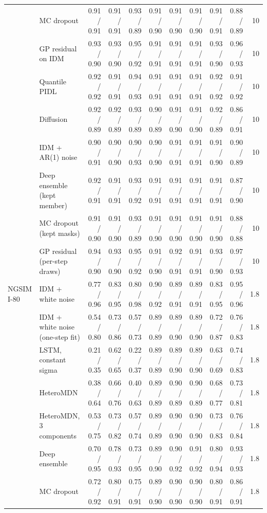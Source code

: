 \begin{longtable}{llrrrrrrrrr}
 & MC dropout & 0.91 / 0.91 & 0.91 / 0.91 & 0.93 / 0.89 & 0.91 / 0.90 & 0.91 / 0.90 & 0.91 / 0.90 & 0.91 / 0.91 & 0.88 / 0.89 & 10 \\
 & GP residual on IDM & 0.93 / 0.90 & 0.93 / 0.90 & 0.95 / 0.92 & 0.91 / 0.91 & 0.91 / 0.91 & 0.91 / 0.91 & 0.93 / 0.90 & 0.96 / 0.93 & 10 \\
 & Quantile PIDL & 0.92 / 0.92 & 0.91 / 0.91 & 0.94 / 0.93 & 0.91 / 0.91 & 0.91 / 0.91 & 0.91 / 0.91 & 0.92 / 0.92 & 0.91 / 0.92 & 10 \\
 & Diffusion & 0.92 / 0.89 & 0.92 / 0.89 & 0.93 / 0.89 & 0.90 / 0.89 & 0.91 / 0.90 & 0.91 / 0.90 & 0.92 / 0.89 & 0.86 / 0.91 & 10 \\
 & IDM + AR(1) noise & 0.90 / 0.91 & 0.90 / 0.90 & 0.90 / 0.93 & 0.90 / 0.90 & 0.91 / 0.91 & 0.91 / 0.91 & 0.91 / 0.90 & 0.90 / 0.89 & 10 \\
 & Deep ensemble (kept member) & 0.92 / 0.91 & 0.91 / 0.91 & 0.93 / 0.92 & 0.91 / 0.91 & 0.91 / 0.91 & 0.91 / 0.91 & 0.91 / 0.91 & 0.87 / 0.90 & 10 \\
 & MC dropout (kept masks) & 0.91 / 0.90 & 0.91 / 0.90 & 0.93 / 0.89 & 0.91 / 0.90 & 0.91 / 0.90 & 0.91 / 0.90 & 0.91 / 0.90 & 0.88 / 0.88 & 10 \\
 & GP residual (per-step draws) & 0.94 / 0.90 & 0.93 / 0.90 & 0.95 / 0.92 & 0.91 / 0.90 & 0.92 / 0.91 & 0.91 / 0.91 & 0.93 / 0.90 & 0.97 / 0.93 & 10 \\
\midrule
NGSIM I-80 & IDM + white noise & 0.77 / 0.96 & 0.83 / 0.95 & 0.80 / 0.98 & 0.90 / 0.92 & 0.89 / 0.91 & 0.89 / 0.91 & 0.83 / 0.95 & 0.95 / 0.96 & 1.8 \\
 & IDM + white noise (one-step fit) & 0.54 / 0.80 & 0.73 / 0.86 & 0.57 / 0.73 & 0.89 / 0.89 & 0.89 / 0.90 & 0.89 / 0.90 & 0.72 / 0.87 & 0.76 / 0.83 & 1.8 \\
 & LSTM, constant sigma & 0.21 / 0.35 & 0.62 / 0.65 & 0.22 / 0.37 & 0.89 / 0.89 & 0.89 / 0.90 & 0.89 / 0.90 & 0.63 / 0.69 & 0.74 / 0.83 & 1.8 \\
 & HeteroMDN & 0.38 / 0.64 & 0.66 / 0.76 & 0.40 / 0.63 & 0.89 / 0.89 & 0.90 / 0.89 & 0.90 / 0.89 & 0.68 / 0.77 & 0.73 / 0.81 & 1.8 \\
 & HeteroMDN, 3 components & 0.53 / 0.75 & 0.73 / 0.82 & 0.57 / 0.74 & 0.89 / 0.89 & 0.90 / 0.90 & 0.90 / 0.90 & 0.73 / 0.83 & 0.76 / 0.84 & 1.8 \\
 & Deep ensemble & 0.70 / 0.95 & 0.78 / 0.93 & 0.73 / 0.95 & 0.89 / 0.90 & 0.90 / 0.92 & 0.91 / 0.92 & 0.80 / 0.94 & 0.93 / 0.93 & 1.8 \\
 & MC dropout & 0.72 / 0.92 & 0.80 / 0.91 & 0.75 / 0.91 & 0.89 / 0.90 & 0.90 / 0.90 & 0.90 / 0.90 & 0.80 / 0.91 & 0.86 / 0.91 & 1.8 \\

\end{longtable}
